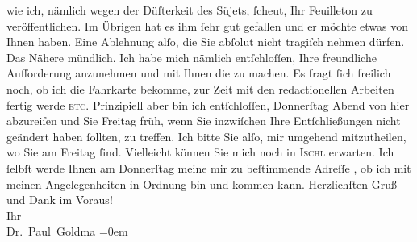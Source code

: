 \begin{ledgroupsized}[t]{13cm}
               wie ich, nämlich wegen der Düſterkeit des Süjets, ſcheut, Ihr Feuilleton zu veröffentlichen. Im Übrigen
               hat es ihm ſehr gut gefallen und er möchte etwas \label{K_L02642-1v}\label{K_L02642-1h} von Ihnen haben. Eine Ablehnung alſo, die Sie abſolut {\pb}nicht tragiſch nehmen dürfen. Das Nähere
               mündlich.\pend
           \pstart
           Ich habe mich nämlich entſchloſſen, Ihre freundliche Aufforderung anzunehmen und mit
               Ihnen die \label{K_L02642-2v}\label{K_L02642-2h}
               zu machen. Es fragt ſich freilich noch, ob ich die Fahrkarte bekomme, zur Zeit mit
               den redactionellen Arbeiten fertig werde \textsc{etc}. Prinzipiell
               aber bin ich entſchloſſen, Donnerſtag{ }Abend von hier
               abzureiſen und Sie Freitag{ }früh, wenn Sie inzwiſchen Ihre Entſchließungen nicht geändert haben
               ſollten, \label{K_L02642-4v}\label{K_L02642-4h} zu treffen. Ich
               bitte Sie alſo, mir umgehend mitzutheilen, wo Sie am Freitag ſind. {\pb}Vielleicht können Sie mich
               noch in \textsc{Ischl} erwarten. Ich ſelbſt werde Ihnen am Donnerſtag
               meine mir zu beſtimmende Adreſſe \label{K_L02642-3v}\label{K_L02642-3h}, ob ich mit meinen Angelegenheiten in
               Ordnung bin und kommen kann.\pend
           \pstart
           Herzlichſten Gruß und Dank im Voraus! {\\[\baselineskip]}Ihr {\\[\baselineskip]}\spacefill\mbox{Dr. Paul Goldma{\geminationn}}\pend
           \leftskip=0em{}
         

\end{ledgroupsized}
